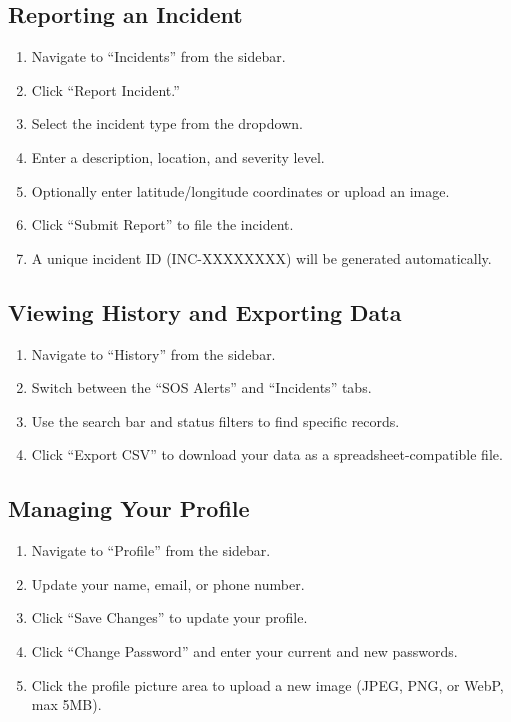 \subsection{Reporting an Incident}
\begin{enumerate}
  \item Navigate to ``Incidents'' from the sidebar.
  \item Click ``Report Incident.''
  \item Select the incident type from the dropdown.
  \item Enter a description, location, and severity level.
  \item Optionally enter latitude/longitude coordinates or upload an image.
  \item Click ``Submit Report'' to file the incident.
  \item A unique incident ID (INC-XXXXXXXX) will be generated automatically.
\end{enumerate}

\subsection{Viewing History and Exporting Data}
\begin{enumerate}
  \item Navigate to ``History'' from the sidebar.
  \item Switch between the ``SOS Alerts'' and ``Incidents'' tabs.
  \item Use the search bar and status filters to find specific records.
  \item Click ``Export CSV'' to download your data as a spreadsheet-compatible file.
\end{enumerate}

\subsection{Managing Your Profile}
\begin{enumerate}
  \item Navigate to ``Profile'' from the sidebar.
  \item Update your name, email, or phone number.
  \item Click ``Save Changes'' to update your profile.
  \item Click ``Change Password'' and enter your current and new passwords.
  \item Click the profile picture area to upload a new image (JPEG, PNG, or WebP, max 5MB).
\end{enumerate}

